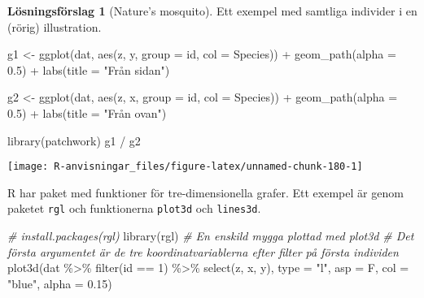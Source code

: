 \documentclass[
]{book}
\newenvironment{Shaded}{\begin{snugshade}}{\end{snugshade}}
\newcommand{\AttributeTok}[1]{\textcolor[rgb]{0.77,0.63,0.00}{#1}}
\newcommand{\CommentTok}[1]{\textcolor[rgb]{0.56,0.35,0.01}{\textit{#1}}}
\newcommand{\DecValTok}[1]{\textcolor[rgb]{0.00,0.00,0.81}{#1}}
\newcommand{\FloatTok}[1]{\textcolor[rgb]{0.00,0.00,0.81}{#1}}
\newcommand{\FunctionTok}[1]{\textcolor[rgb]{0.00,0.00,0.00}{#1}}
\newcommand{\NormalTok}[1]{#1}
\newcommand{\OtherTok}[1]{\textcolor[rgb]{0.56,0.35,0.01}{#1}}
\newcommand{\SpecialCharTok}[1]{\textcolor[rgb]{0.00,0.00,0.00}{#1}}
\newcommand{\StringTok}[1]{\textcolor[rgb]{0.31,0.60,0.02}{#1}}
\theoremstyle{definition}
\theoremstyle{definition}
\theoremstyle{definition}
\theoremstyle{definition}
\newtheorem{hypothesis}{Lösningsförslag}[chapter]
\theoremstyle{remark}
\begin{document}
\begin{hypothesis}[Nature's mosquito]
Ett exempel med samtliga individer i en (rörig) illustration.

\begin{Shaded}
\begin{Highlighting}[]
\NormalTok{g1 }\OtherTok{\textless{}{-}} \FunctionTok{ggplot}\NormalTok{(dat, }\FunctionTok{aes}\NormalTok{(z, y, }\AttributeTok{group =}\NormalTok{ id, }\AttributeTok{col =}\NormalTok{ Species)) }\SpecialCharTok{+} 
  \FunctionTok{geom\_path}\NormalTok{(}\AttributeTok{alpha =} \FloatTok{0.5}\NormalTok{) }\SpecialCharTok{+}
  \FunctionTok{labs}\NormalTok{(}\AttributeTok{title =} \StringTok{"Från sidan"}\NormalTok{)}

\NormalTok{g2 }\OtherTok{\textless{}{-}} \FunctionTok{ggplot}\NormalTok{(dat, }\FunctionTok{aes}\NormalTok{(z, x, }\AttributeTok{group =}\NormalTok{ id, }\AttributeTok{col =}\NormalTok{ Species)) }\SpecialCharTok{+} 
  \FunctionTok{geom\_path}\NormalTok{(}\AttributeTok{alpha =} \FloatTok{0.5}\NormalTok{) }\SpecialCharTok{+}
  \FunctionTok{labs}\NormalTok{(}\AttributeTok{title =} \StringTok{"Från ovan"}\NormalTok{)}

\FunctionTok{library}\NormalTok{(patchwork)}
\NormalTok{g1 }\SpecialCharTok{/}\NormalTok{ g2}
\end{Highlighting}
\end{Shaded}

\begin{center}\texttt{[image: R-anvisningar\_files/figure-latex/unnamed-chunk-180-1]} \end{center}

R har paket med funktioner för tre-dimensionella grafer. Ett exempel är genom paketet \texttt{rgl} och funktionerna \texttt{plot3d} och \texttt{lines3d}.

\begin{Shaded}
\begin{Highlighting}[]
\CommentTok{\# install.packages(rgl)}
\FunctionTok{library}\NormalTok{(rgl)}
\CommentTok{\# En enskild mygga plottad med plot3d}
\CommentTok{\# Det första argumentet är de tre koordinatvariablerna efter filter på första individen}
\FunctionTok{plot3d}\NormalTok{(dat }\SpecialCharTok{\%\textgreater{}\%} \FunctionTok{filter}\NormalTok{(id }\SpecialCharTok{==} \DecValTok{1}\NormalTok{) }\SpecialCharTok{\%\textgreater{}\%} \FunctionTok{select}\NormalTok{(z, x, y), }\AttributeTok{type =} \StringTok{"l"}\NormalTok{, }\AttributeTok{asp =}\NormalTok{ F, }\AttributeTok{col =} \StringTok{"blue"}\NormalTok{, }\AttributeTok{alpha =} \FloatTok{0.15}\NormalTok{)}


\end{Highlighting}
\end{Shaded}
\end{hypothesis}
\end{document}
